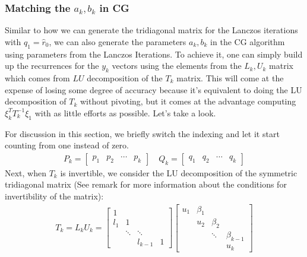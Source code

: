 \documentclass[]{article}
\theoremstyle{definition}
\begin{document}
        \subsubsection{Matching the $a_k, b_k$ in CG}
            Similar to how we can generate the tridiagonal matrix for the Lanczos iterations with $q_1 = \hat{r}_0$, we can also generate the parameters $a_k, b_k$ in the CG algorithm using parameters from the Lanczos Iterations. To achieve it, one can simply build up the recurrences for the $y_k$ vectors using the elements from the $L_k, U_k$ matrix which comes from $LU$ decomposition of the $T_k$ matrix. This will come at the expense of losing some degree of accuracy because it's equivalent to doing the LU decomposition of $T_k$ without pivoting, but it comes at the advantage computing $\xi_k^TT_k^{-1}\xi_1$  with as little efforts as possible. Let's take a look. 
            \par
            For discussion in this section, we briefly switch the indexing and let it start counting from one instead of zero. 
            \begin{align}
                P_k = \begin{bmatrix}
                    p_1 & p_2& \cdots & p_k
                \end{bmatrix} \quad
                Q_k = \begin{bmatrix}
                    q_1 & q_2 & \cdots & q_k
                \end{bmatrix}
            \end{align}
            Next, when $T_k$ is invertible, we consider the LU decomposition of the symmetric tridiagonal matrix (See remark for more information about the conditions for invertibility of the matrix): 
            \begin{align}
                T_k = L_k U_k =
                \begin{bmatrix}
                    1 & & & \\
                    l_1 & 1 & & \\
                    & \ddots& \ddots & 
                    \\
                    & & l_{k - 1} & 1
                \end{bmatrix}\begin{bmatrix}
                    u_1& \beta_1 & & \\
                    & u_2 &\beta_2 & \\
                    & &\ddots & \beta_{k - 1}\\
                    & & & u_k
                \end{bmatrix}
            \end{align}
\end{document}
